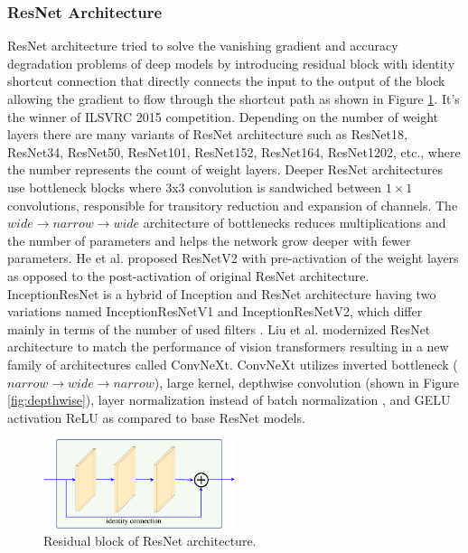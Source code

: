 \subsubsection{ResNet Architecture}
ResNet architecture \cite{He2016} tried to solve the vanishing gradient and accuracy degradation problems of deep models by introducing residual block with identity shortcut connection that directly connects the input to the output of the block allowing the gradient to flow through the shortcut path as shown in Figure \ref{fig:resnet}. It’s the winner of ILSVRC 2015 competition. Depending on the number of weight layers there are many variants of ResNet architecture such as ResNet18, ResNet34, ResNet50, ResNet101, ResNet152, ResNet164, ResNet1202, etc., where the number represents the count of weight layers. Deeper ResNet architectures use bottleneck blocks where 3x3 convolution is sandwiched between $1\times1$ convolutions, responsible for transitory reduction and expansion of channels.  The $wide\rightarrow narrow \rightarrow wide$ architecture of bottlenecks reduces multiplications and the number of parameters and helps the network grow deeper with fewer parameters. He et al. \cite{He2016a} proposed ResNetV2 with pre-activation of the weight layers as opposed to the post-activation of original ResNet architecture.  InceptionResNet is a hybrid of Inception and ResNet architecture having two variations named InceptionResNetV1 and InceptionResNetV2, which differ mainly in terms of the number of used filters \cite{Szegedy2017}. Liu et al. \cite{ConvNeXtRef} modernized ResNet architecture to match the performance of vision transformers resulting in a new family of architectures called ConvNeXt. ConvNeXt utilizes inverted bottleneck ( $narrow\rightarrow wide \rightarrow narrow$), large kernel, depthwise convolution (shown in Figure \ref{fig:depthwise}), layer normalization \cite{LayerNormRef} instead of batch normalization \cite{BatchNormref}, and GELU activation ReLU as compared to base ResNet models.
\begin{figure}[htb!]
	\centering
	\includegraphics[width=0.5\textwidth,keepaspectratio]{images/pretraining/ResNet-cropped.pdf}
	\caption[Residual block of ResNet architecture]{Residual block of ResNet architecture.}
	\label{fig:resnet}
\end{figure}

